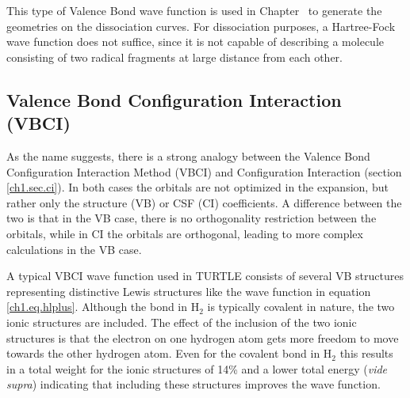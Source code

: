 This type of Valence Bond wave function is used in Chapter \chdissociation\ to generate the geometries on the dissociation curves. For dissociation purposes, a Hartree-Fock wave function does not suffice, since it is not capable of describing a molecule consisting of two radical fragments at large distance from each other.

\subsection{Valence Bond Configuration Interaction (VBCI)}

As the name suggests, there is a strong analogy between the Valence Bond Configuration Interaction Method (VBCI) and Configuration Interaction (section \ref{ch1.sec.ci}). In both cases the orbitals are not optimized in the expansion, but rather only the structure (VB) or CSF (CI) coefficients. A difference between the two is that in the VB case, there is no orthogonality restriction between the orbitals, while in CI the orbitals are orthogonal, leading to more complex calculations in the VB case.

A typical VBCI wave function used in TURTLE consists of several VB structures representing distinctive Lewis structures like the wave function in equation \ref{ch1.eq.hlplus}. Although the bond in H$_2$ is typically covalent in nature, the two ionic structures are included. The effect of the inclusion of the two ionic structures is that the electron on one hydrogen atom gets more freedom to move towards the other hydrogen atom. Even for the covalent bond in H$_2$ this results in a total weight for the ionic structures of 14\% and a lower total energy (\textit{vide supra}) indicating that including these structures improves the wave function.

